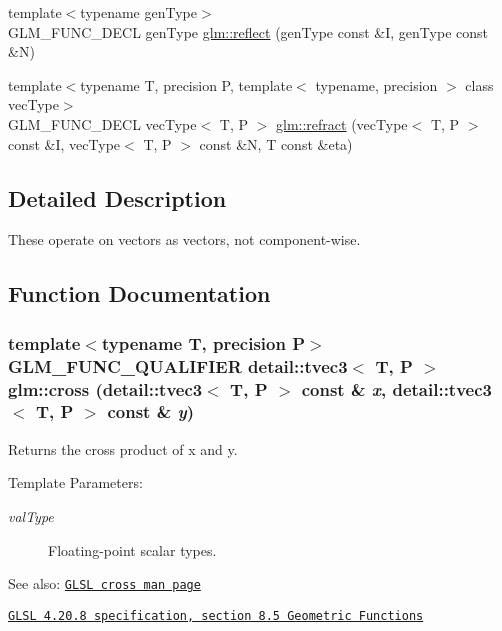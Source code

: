 \begin{CompactItemize}
\item 
{\footnotesize template$<$typename genType$>$ }\\GLM\_\-FUNC\_\-DECL genType \hyperlink{group__core__func__geometric_gc973ce2bc49f749a469d3ed2e2ac5a54}{glm::reflect} (genType const \&I, genType const \&N)
\item 
{\footnotesize template$<$typename T, precision P, template$<$ typename, precision $>$ class vecType$>$ }\\GLM\_\-FUNC\_\-DECL vecType$<$ T, P $>$ \hyperlink{group__core__func__geometric_g2020e01c134ebe03c1690306ff93af53}{glm::refract} (vecType$<$ T, P $>$ const \&I, vecType$<$ T, P $>$ const \&N, T const \&eta)
\end{CompactItemize}


\subsection{Detailed Description}
These operate on vectors as vectors, not component-wise. 

\subsection{Function Documentation}
\hypertarget{group__core__func__geometric_g9a325364ff3650c4a85c33704c646e76}{
\subsubsection[cross]{\setlength{\rightskip}{0pt plus 5cm}template$<$typename T, precision P$>$ GLM\_\-FUNC\_\-QUALIFIER detail::tvec3$<$ T, P $>$ glm::cross (detail::tvec3$<$ T, P $>$ const \& {\em x}, \/  detail::tvec3$<$ T, P $>$ const \& {\em y})}}
\label{group__core__func__geometric_g9a325364ff3650c4a85c33704c646e76}


Returns the cross product of x and y.

\begin{Desc}
\item[Template Parameters:]
\begin{description}
\item[{\em valType}]Floating-point scalar types.\end{description}
\end{Desc}
\begin{Desc}
\item[See also:]\href{http://www.opengl.org/sdk/docs/manglsl/xhtml/cross.xml}{\tt GLSL cross man page} 

\href{http://www.opengl.org/registry/doc/GLSLangSpec.4.20.8.pdf}{\tt GLSL 4.20.8 specification, section 8.5 Geometric Functions} \end{Desc}


